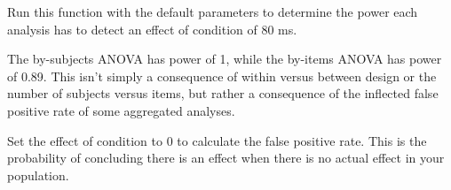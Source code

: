 \documentclass[man,floatsintext]{apa6}
\newenvironment{Shaded}{\begin{snugshade}}{\end{snugshade}}
\newcommand{\KeywordTok}[1]{\textcolor[rgb]{0.13,0.29,0.53}{\textbf{#1}}}
\newcommand{\DataTypeTok}[1]{\textcolor[rgb]{0.13,0.29,0.53}{#1}}
\newcommand{\DecValTok}[1]{\textcolor[rgb]{0.00,0.00,0.81}{#1}}
\newcommand{\FloatTok}[1]{\textcolor[rgb]{0.00,0.00,0.81}{#1}}
\newcommand{\StringTok}[1]{\textcolor[rgb]{0.31,0.60,0.02}{#1}}
\newcommand{\OperatorTok}[1]{\textcolor[rgb]{0.81,0.36,0.00}{\textbf{#1}}}
\newcommand{\NormalTok}[1]{#1}
\begin{document}
Run this function with the default parameters to determine the power
each analysis has to detect an effect of condition of 80 ms.

\begin{Shaded}
\end{Shaded}

The by-subjects ANOVA has power of 1, while the by-items ANOVA has power
of 0.89. This isn't simply a consequence of within versus between design
or the number of subjects versus items, but rather a consequence of the
inflected false positive rate of some aggregated analyses.

Set the effect of condition to 0 to calculate the false positive rate.
This is the probability of concluding there is an effect when there is
no actual effect in your population.

\begin{Shaded}
\end{Shaded}
\end{document}
